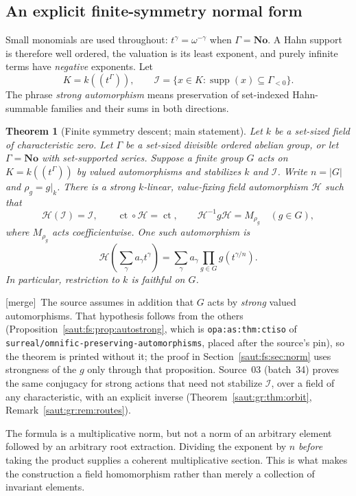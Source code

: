 \documentclass[11pt]{article}
\newtheorem{theorem}{Theorem}[section]
\theoremstyle{definition}
\theoremstyle{remark}
\newcommand{\No}{\mathbf{No}}
\newcommand{\supp}{\operatorname{supp}}
\newcommand{\repo}[1]{\nolinkurl{#1}}%
\newcommand{\lbl}[1]{\nolinkurl{#1}}%
\newcommand{\ct}{\operatorname{ct}}
\newcommand{\Ineg}{\mathcal I}
\newcommand{\mergetag}{\textup{[merge]}}
\numberwithin{equation}{section}
\begin{document}
\subsection{An explicit finite-symmetry normal form}

Small monomials are used throughout: $t^\gamma=\omega^{-\gamma}$ when $\Gamma=\No$.
A Hahn support is therefore well ordered, the valuation is its least exponent, and
purely infinite terms have \emph{negative} exponents. Let
\[
 K=k((t^\Gamma)),\qquad
 \Ineg=\{x\in K:\supp(x)\subseteq\Gamma_{<0}\}.
\]
The phrase \emph{strong automorphism} means preservation of set-indexed
Hahn-summable families and their sums in both directions.

\begin{theorem}[Finite symmetry descent; main statement]\label{saut:fs:thm:main-descent}
Let $k$ be a set-sized field of characteristic zero. Let $\Gamma$ be a set-sized
divisible ordered abelian group, or let $\Gamma=\No$ with set-supported series.
Suppose a finite group $G$ acts on $K=k((t^\Gamma))$ by valued automorphisms and
stabilizes $k$ and $\Ineg$. Write $n=|G|$ and $\rho_g=g|_k$. There is a strong
$k$-linear, value-fixing field automorphism $\mathcal H$ such that
\[
 \mathcal H(\Ineg)=\Ineg,\qquad \ct\circ\mathcal H=\ct,\qquad
 \mathcal H^{-1}g\mathcal H=M_{\rho_g}\quad(g\in G),
\]
where $M_{\rho_g}$ acts coefficientwise. One such automorphism is
\begin{equation}\label{saut:fs:eq:main-norm}
 \mathcal H\left(\sum_\gamma a_\gamma t^\gamma\right)
 =\sum_\gamma a_\gamma\prod_{g\in G}g(t^{\gamma/n}).
\end{equation}
In particular, restriction to $k$ is faithful on $G$.
\end{theorem}

\mergetag\ The source assumes in addition that $G$ acts by \emph{strong} valued
automorphisms. That hypothesis follows from the others
(Proposition~\ref{saut:fs:prop:autostrong}, which is \lbl{opa:as:thm:ctiso} of
\repo{surreal/omnific-preserving-automorphisms}, placed after the source's pin), so
the theorem is printed without it; the proof in
Section~\ref{saut:fs:sec:norm} uses strongness of the $g$ only through that
proposition. Source~03 (batch~34) proves the same conjugacy for strong actions that
need not stabilize $\Ineg$, over a field of any characteristic, with an explicit
inverse (Theorem~\ref{saut:gr:thm:orbit}, Remark~\ref{saut:gr:rem:routes}).

The formula is a multiplicative norm, but not a norm of an arbitrary element
followed by an arbitrary root extraction. Dividing the exponent by $n$
\emph{before} taking the product supplies a coherent multiplicative section.
This is what makes the construction a field homomorphism rather than merely a
collection of invariant elements.
\end{document}
